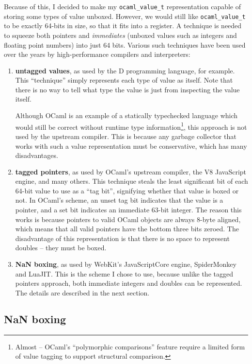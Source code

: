 \documentclass[12pt,a4paper,twoside,openright]{report}
\begin{document}
Because of this, I decided to make my \lstinline!ocaml_value_t! representation
capable of storing some types of value unboxed. However, we would still like
\lstinline!ocaml_value_t! to be exactly 64-bits in size, so that it fits into a
register. A technique is needed to squeeze both pointers and \textit{immediates}
(unboxed values such as integers and floating point numbers) into just 64 bits.
Various such techniques have been used over the years by high-performance
compilers and interpreters:
\begin{enumerate}
  \item \textbf{untagged values}, as used by the D programming language, for
    example. This ``technique'' simply represents each type of value as itself.
    Note that there is no way to tell what type the value is just from inspecting the value itself.

    Although OCaml is an example of a statically typechecked language which would
    still be correct without runtime type information\footnote{Almost -- OCaml's
    ``polymorphic comparisons'' feature require a limited form of value tagging
    to support structural comparison.}, this approach is not used by the upstream
    compiler. This is because any garbage collector that works with such a
    value representation must be conservative, which has many
    disadvantages.
  \item \textbf{tagged pointers}, as used by OCaml's upstream compiler, the V8
    JavaScript engine, and many others. This technique steals the least
    significant bit of each 64-bit value to use as a ``tag bit'', signifying whether
    that value is boxed or not. In OCaml's scheme, an unset tag bit indicates
    that the value is a pointer, and a set bit indicates an immediate 63-bit integer.
    The reason this works is because pointers to valid OCaml objects are always
    8-byte aligned, which means that all valid pointers have the bottom
    three bits zeroed. The disadvantage of this representation is that there is
    no space to represent doubles -- they must be boxed.
  \item \textbf{NaN boxing}, as used by WebKit's JavaScriptCore engine,
    SpiderMonkey and LuaJIT. This is the scheme I chose to use, because unlike
    the tagged pointers approach, both immediate integers and doubles can be
    represented. The details are described in the next section.
\end{enumerate}

\subsection{NaN boxing}\label{nan-boxing}
\end{document}
